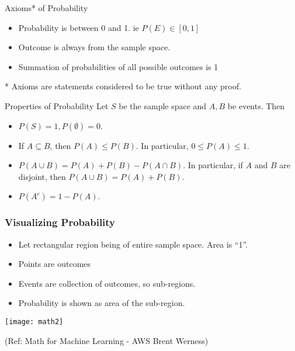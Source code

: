 \begin{frame}{Axioms* of Probability}
\begin{itemize}
\item Probability is between 0 and 1. ie $P(E) \in [0,1]$
\item Outcome is always from the sample space.
\item Summation of probabilities of all possible outcomes is 1
\end{itemize}

* Axioms are statements considered to be true without any proof.
\end{frame}



\begin{frame}{Properties of Probability}
Let $S$ be the sample space and $A,B$ be events.  Then
\begin{itemize}
\item $P(S)=1, P(\emptyset)=0$. 
\item If $A\subseteq B$, then $P(A)\leq P(B)$.  In particular, $0\leq P(A)\leq 1$. 
\item $P(A\cup B)=P(A)+P(B)-P(A\cap B)$.  In particular, if $A$ and $B$ are disjoint, then $P(A
\cup B)=P(A)+P(B)$. 
\item $P(A^c)=1-P(A)$.
\end{itemize}
\end{frame}


\begin{frame}
\frametitle{Visualizing Probability}
\begin{itemize}
\item  Let rectangular region being of entire sample space. Area is ``1''.
\item Points are outcomes
\item Events are collection of outcomes, so sub-regions.
\item Probability is shown as area of the sub-region.
\end{itemize}

\begin{center}
\texttt{[image: math2]}
\end{center}

\tiny{(Ref: Math for Machine Learning - AWS Brent Werness)}
\end{frame}

